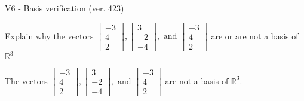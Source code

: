 \begin{exercise}
  \begin{exerciseTitle}V6 - Basis verification (ver. 423)\end{exerciseTitle}
  \begin{exerciseStatement}
    Explain why the vectors \(\left[\begin{array}{r}
-3 \\
4 \\
2
\end{array}\right] , \left[\begin{array}{r}
3 \\
-2 \\
-4
\end{array}\right] , \text{ and } \left[\begin{array}{r}
-3 \\
4 \\
2
\end{array}\right]\) are or are not a basis of \(\mathbb{R}^3\)	


  \end{exerciseStatement}
  \begin{exerciseAnswer}
   The vectors \(\left[\begin{array}{r}
-3 \\
4 \\
2
\end{array}\right] , \left[\begin{array}{r}
3 \\
-2 \\
-4
\end{array}\right] , \text{ and } \left[\begin{array}{r}
-3 \\
4 \\
2
\end{array}\right]\) 
  	 are not  a basis of \(\mathbb{R}^3\).
  


  \end{exerciseAnswer}
\end{exercise}